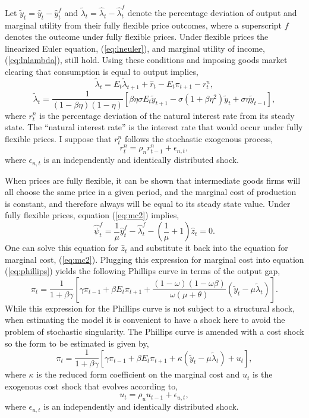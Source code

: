 \documentclass[10pt]{article}
\newcommand{\beq}{\begin{equation}}
\newcommand{\eeq}{\end{equation}}
\newcommand{\bdm}{\begin{displaymath}}
\newcommand{\edm}{\end{displaymath}}
\newcommand{\h}[1]{\hat{#1}}
\begin{document}
Let $\tilde{y}_t = \h{y}_t - \h{y}_t^f$ and $\tilde{\lambda}_t = \h{\lambda}_t - \h{\lambda}_t^f$ denote the percentage deviation of output and marginal utility from their fully flexible price outcomes, where a superscript $f$ denotes the outcome under fully flexible prices.  Under flexible prices the linearized Euler equation, (\ref{eq:lneuler}), and marginal utility of income, (\ref{eq:lnlambda}), still hold.  Using these conditions and imposing goods market clearing that consumption is equal to output implies,
\beq \label{eq:gapeuler} \tilde{\lambda}_{t} = E_t \tilde{\lambda}_{t+1} + \h{r}_t - E_t \pi_{t+1} - r_t^n, \eeq
\beq \label{eq:gaplambda} \tilde{\lambda}_t = \frac{1}{ (1-\beta \eta)(1-\eta)}\left[ \beta \eta \sigma E_t \tilde{y}_{t+1} - \sigma(1+\beta \eta^2) \tilde{y}_t + \sigma \eta \tilde{y}_{t-1} \right], \eeq
where $r_t^n$ is the percentage deviation of the natural interest rate from its steady state.  The ``natural interest rate'' is the interest rate that would occur under fully flexible prices.  I suppose that $r_t^n$ follows the stochastic exogenous process,
\beq \label{eq:natint} r_t^n = \rho_n r_{t-1}^n + \epsilon_{n,t}, \eeq
where $\epsilon_{n,t}$ is an independently and identically distributed shock.

When prices are fully flexible, it can be shown that intermediate goods firms will all choose the same price in a given period, and the marginal cost of production is constant, and therefore always will be equal to its steady state value.  Under fully flexible prices, equation (\ref{eq:mc2}) implies,
\bdm \h{\psi}_t^f = \frac{1}{\mu} \h{y}_t^f - \h{\lambda}_t^f - \left(\frac{1}{\mu} + 1\right) \h{z}_t = 0. \edm
One can solve this equation for $\h{z}_t$ and substitute it back into the equation for marginal cost, (\ref{eq:mc2}).  Plugging this expression for marginal cost into equation (\ref{eq:phillips}) yields the following Phillips curve in terms of the output gap,
\bdm \label{eq:phillips1} \pi_t = \frac{1}{1+\beta \gamma} \left[ \gamma \pi_{t-1} + \beta E_t \pi_{t+1} + \frac{(1-\omega)(1-\omega \beta)}{\omega (\mu + \theta)} (\tilde{y}_t - \mu \tilde{\lambda}_t) \right]. \edm
While this expression for the Phillips curve is not subject to a structural shock, when estimating the model it is convenient to have a shock here to avoid the problem of stochastic singularity.  The Phillips curve is amended with a cost shock so the form to be estimated is given by,
\beq \label{eq:gapphillips} \pi_t = \frac{1}{1+\beta \gamma} \left[ \gamma \pi_{t-1} + \beta E_t \pi_{t+1} + \kappa (\tilde{y}_t - \mu \tilde{\lambda}_t) + u_t\right], \eeq
where $\kappa$ is the reduced form coefficient on the marginal cost and $u_t$ is the exogenous cost shock that evolves according to,
\beq \label{eq:costpush} u_t = \rho_u u_{t-1} + \epsilon_{u,t}, \eeq
where $\epsilon_{u,t}$ is an independently and identically distributed shock.
\end{document}
